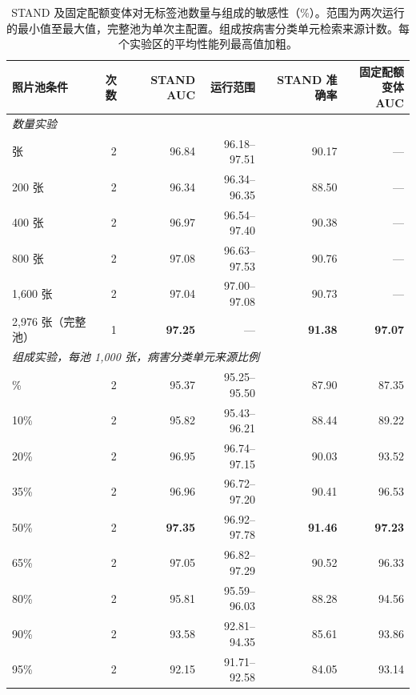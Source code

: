 \begin{table}[htbp]
\centering\small
\caption{STAND 及固定配额变体对无标签池数量与组成的敏感性（\%）。范围为两次运行的最小值至最大值，完整池为单次主配置。组成按病害分类单元检索来源计数。每个实验区的平均性能列最高值加粗。}
\label{tab:pool}
\begin{adjustbox}{max width=\linewidth}
\begin{tabular}{lrrrrr}
\toprule
照片池条件 & 次数 & STAND AUC & 运行范围 & STAND 准确率 & \makecell{固定配额变体\\AUC}\\
\midrule
\multicolumn{6}{l}{\textit{数量实验}}\\
\addlinespace[2pt]
100 张 & 2 & 96.84 & 96.18--97.51 & 90.17 & ---\\
200 张 & 2 & 96.34 & 96.34--96.35 & 88.50 & ---\\
400 张 & 2 & 96.97 & 96.54--97.40 & 90.38 & ---\\
800 张 & 2 & 97.08 & 96.63--97.53 & 90.76 & ---\\
1,600 张 & 2 & 97.04 & 97.00--97.08 & 90.73 & ---\\
2,976 张（完整池） & 1 & \textbf{97.25} & --- & \textbf{91.38} & \textbf{97.07}\\
\midrule
\multicolumn{6}{l}{\textit{组成实验，每池 1,000 张，病害分类单元来源比例}}\\
\addlinespace[2pt]
5\% & 2 & 95.37 & 95.25--95.50 & 87.90 & 87.35\\
10\% & 2 & 95.82 & 95.43--96.21 & 88.44 & 89.22\\
20\% & 2 & 96.95 & 96.74--97.15 & 90.03 & 93.52\\
35\% & 2 & 96.96 & 96.72--97.20 & 90.41 & 96.53\\
50\% & 2 & \textbf{97.35} & 96.92--97.78 & \textbf{91.46} & \textbf{97.23}\\
65\% & 2 & 97.05 & 96.82--97.29 & 90.52 & 96.33\\
80\% & 2 & 95.81 & 95.59--96.03 & 88.28 & 94.56\\
90\% & 2 & 93.58 & 92.81--94.35 & 85.61 & 93.86\\
95\% & 2 & 92.15 & 91.71--92.58 & 84.05 & 93.14\\
\bottomrule
\end{tabular}
\end{adjustbox}
\end{table}
